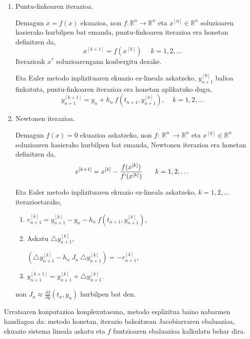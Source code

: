 \begin{enumerate}

\item Puntu-finkoaren iterazioa.

Demagun $x=f(x)$ ekuazioa, non $f: {\mathbb{R}}^n  \longrightarrow {\mathbb{R}}^n$ eta  $x^{[0]} \in \mathbb{R}^n$ soluzioaren hasierako hurbilpen bat emanda, puntu-finkoaren iterazioa era honetan definitzen da,
\begin{equation*}
 x^{[k+1]}=f(x^{[k]}) \, \ \ \ \ \ k=1,2,\dots
\end{equation*}
Iterazioak $x^{\ast}$ soluzioarengana konbergitu dezake.

Eta  Euler metodo inplizituaren ekuazio ez-lineala askatzeko, $y_{n+1}^{[0]}$ balioa finkatuta, puntu-finkoaren iterazioa era honetan aplikatuko dugu, 
\begin{equation*}
y_{n+1}^{[k+1]}=y_{n}+h_n \ f(t_{n+1},y_{n+1}^{[k]}), \ \ \ \ \ k=1,2,\dots
\end{equation*}  

\item Newtonen iterazioa.

Demagun $f(x)=0$ ekuazioa askatzeko, non $f: \  {\mathbb{R}}^n \ \longrightarrow {\mathbb{R}}^n$ eta  $x^{[0]} \in \mathbb{R}^n$ soluzioaren hasierako hurbilpen bat emanda, Newtonen iterazioa era honetan definitzen da,
\begin{equation*}
 x^{[k+1]}=x^{[k]}-\frac{f(x^{[k]})}{f`(x^{[k]})} \, \ \ \ \ \ k=1,2,\dots
\end{equation*}

Eta Euler metodo inplizituaren ekuazio ez-lineala askatzeko, $k=1,2,\dots$ iterazioetarako,
\begin{enumerate}
\item $r_{n+1}^{[k]}=y_{n+1}^{[k]}-y_n-h_n \ f(t_{n+1},y_{n+1}^{[k]})$,

\item Askatu $\triangle y_{n+1}^{[k]}$,

$(\triangle y_{n+1}^{[k]} - h_n \ J_n \ \triangle y_{n+1}^{[k]}) =- r_{n+1}^{[k]}$,

\item $y_{n+1}^{[k+1]} = y_{n+1}^{[k]}+ \triangle y_{n+1}^{[k]}$.
\end{enumerate}
non $J_n \approx \frac{\partial f}{\partial y} (t_n, y_n)$ hurbilpen bat den.

\end{enumerate}

Urratsaren konputazioa konplexutasuna, metodo esplizitua baino nabarmen handiagoa da: metodo honetan, iterazio bakoitzean Jacobiarraren ebaluazioa, ekuazio sistema lineala askatu eta $f$ funtzioaren ebaluazioa kalkulatu behar dira.

